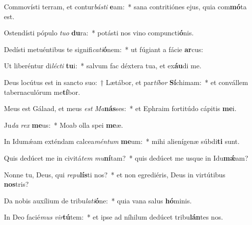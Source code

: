 \item Commovísti terram, et contur\textit{bás}\textit{ti} \textbf{e}am:~* sana contritiónes ejus, quia com\textbf{mó}ta est.
\item Ostendísti pópulo \textit{tu}\textit{o} \textbf{du}ra:~* potásti nos vino compuncti\textbf{ó}nis.
\item Dedísti metuéntibus te signifi\textit{ca}\textit{ti}\textbf{ó}nem:~* ut fúgiant a fácie \textbf{ar}cus:
\item Ut liberéntur di\textit{léc}\textit{ti} \textbf{tu}i:~* salvum fac déxtera tua, et ex\textbf{áu}di me.
\item Deus locútus est in sancto suo:~† Lætábor, et par\textit{tí}\textit{bor} \textbf{Sí}chimam:~* et convállem tabernaculórum me\textbf{tí}bor.
\item Meus est Gálaad, et meus \textit{est} \textit{Ma}\textbf{nás}ses:~* et Ephraim fortitúdo cápitis \textbf{me}i.
\item Ju\textit{da} \textit{rex} \textbf{me}us:~* Moab olla spei \textbf{me}æ.
\item In Idumǽam exténdam calcea\textit{mén}\textit{tum} \textbf{me}um:~* mihi alienígenæ súbdi\textbf{ti} sunt.
\item Quis dedúcet me in civitá\textit{tem} \textit{mu}\textbf{ní}tam?~* quis dedúcet me usque in Idu\textbf{mǽ}am?
\item Nonne tu, Deus, qui \textit{re}\textit{pu}\textbf{lís}ti nos?~* et non egrediéris, Deus in virtútibus \textbf{nos}tris?
\item Da nobis auxílium de tribu\textit{la}\textit{ti}\textbf{ó}ne:~* quia vana salus \textbf{hó}minis.
\item In Deo facié\textit{mus} \textit{vir}\textbf{tú}tem:~* et ipse ad níhilum dedúcet tribu\textbf{lán}tes nos.
